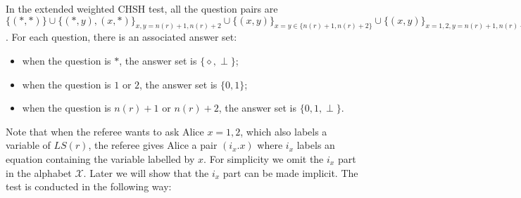 \documentclass[11pt,letterpaper]{article}
\newcommand{\calX}{\mathcal{X}}
\newcommand{\calY}{\mathcal{Y}}
\newcommand{\1}{\mathbb{1}}
\newcommand{\LS}{LS}
\newcommand{\nr}{n(r)}
\theoremstyle{definition}
\begin{document}
In the extended weighted CHSH test,
all the question pairs are $\{ (\ast, \ast) \} \cup \{(\ast, y), (x, \ast)\}_{x,y = \nr+1, \nr+2} \cup 
\{(x,y)\}_{x=y \in \{\nr+1, \nr+2\}} \cup
\{(x,y)\}_{x = 1,2, y =\nr+1, \nr+2} \cup  \{(x,y)\}_{x = \nr+1,\nr+2, y =1, 2}$.
For each question, there is an associated answer set:
\begin{itemize}
	\item when the question is $\ast$, the answer set is $\{\diamond, \perp\}$;
	\item when the question is $1$ or $2$, the answer set is $\{0,1\}$;
	\item when the question is $\nr+1$ or $\nr+2$, the answer set is $\{0, 1, \perp\}$.
\end{itemize}
Note that when the referee wants to ask Alice $x = 1,2$, which also labels a variable of $\LS(r)$, 
the referee gives Alice a pair $(i_x. x)$ where 
$i_x$ labels an equation containing the variable labelled by $x$. 
For simplicity we omit the $i_x$ part in the alphabet $\calX$.
Later we will show that the $i_x$ part can be made implicit.
The test is conducted in the following way:
\end{document}
